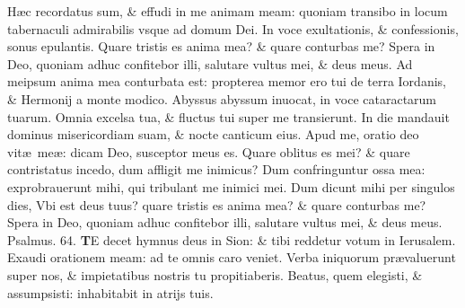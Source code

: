 \documentclass[a5paper,10pt]{book}
\def\ae{æ}
\begin{document}
\begin{multicols*}{2}
\newline \color{red} H\color{black}\ae c recordatus sum, \& effudi in me animam meam: quoniam transibo in locum tabernaculi admirabilis vsque ad domum Dei.
\newline \color{red} I\color{black}n voce exultationis, \& confessionis, sonus epulantis.
\newline \color{red} Q\color{black}uare tristis es anima mea? \& quare conturbas me?
\newline \color{red} S\color{black}pera in Deo, quoniam adhuc confitebor illi, salutare vultus mei, \& deus meus.
\newline \color{red} A\color{black}d meipsum anima mea conturbata est: propterea memor ero tui de terra Iordanis, \& Hermonij a monte modico.%
\newline \color{red} A\color{black}byssus abyssum inuocat, in voce cataractarum tuarum.
\newline \color{red} O\color{black}mnia excelsa tua, \& fluctus tui super me transierunt.
\newline \color{red} I\color{black}n die mandauit dominus misericordiam suam, \& nocte canticum eius.
\newline \color{red} A\color{black}pud me, oratio deo vit\ae \ me\ae : dicam Deo, susceptor meus es.
\newline \color{red} Q\color{black}uare oblitus es mei? \& quare contristatus incedo, dum affligit me inimicus?
\newline \color{red} D\color{black}um confringuntur ossa mea: exprobrauerunt mihi, qui tribulant me inimici mei.
\newline \color{red} D\color{black}um dicunt mihi per singulos dies, Vbi est deus tuus? quare tristis es anima mea? \& quare conturbas me?
\newline \color{red} S\color{black}pera in Deo, quoniam adhuc confitebor illi, salutare vultus mei, \& deus meus. \quad \color{red} Psalmus. 64. \color{black}
\vspace{-1em}
\lettrine[lines=2]{\bfseries \color{red} T}{}E decet hymnus deus in Sion: \& tibi reddetur votum in Ierusalem.
\newline \color{red} E\color{black}xaudi orationem meam: ad te omnis caro veniet.
\newline \color{red} V\color{black}erba iniquorum pr\ae valuerunt super nos, \& impietatibus nostris tu propitiaberis.
\newline \color{red} B\color{black}eatus, quem elegisti, \& assumpsisti: inhabitabit in atrijs tuis.

\end{multicols*}
\end{document}
